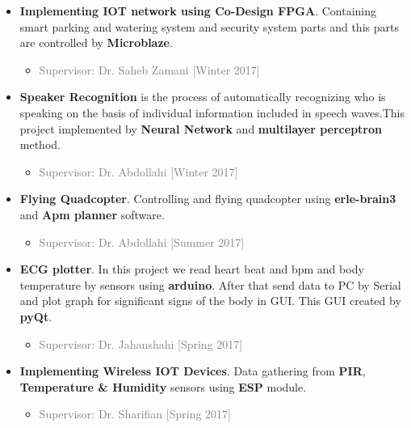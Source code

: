 \documentclass[10pt,a4paper,sans]{moderncv} %
\begin{document}
\begin{itemize}
	\item \textbf{Implementing IOT network using Co-Design FPGA}. Containing smart parking and watering system and security system parts and this parts are controlled by \textbf{Microblaze}.
	\begin{itemize}
		\item \textcolor{gray}{Supervisor: Dr. Saheb Zamani [Winter 2017]}
		\newline
	\end{itemize}

	\item \textbf{Speaker Recognition} is the process of automatically recognizing who is speaking on the basis of individual information included in speech waves.This project implemented by  \textbf{Neural Network} and \textbf{multilayer perceptron} method.
	\begin{itemize}
		\item \textcolor{gray}{Supervisor: Dr. Abdollahi [Winter 2017]}
		\newline
	\end{itemize}

	\item \textbf{Flying Quadcopter}. Controlling and flying quadcopter using \textbf{erle-brain3} and \textbf{Apm planner} software.
	\begin{itemize}
		\item \textcolor{gray}{Supervisor: Dr. Abdollahi [Summer 2017]}
		\newline
	\end{itemize}

	\item \textbf{ECG plotter}. In this project we read heart beat and bpm and body temperature by sensors using \textbf{arduino}. After that send data to PC by Serial and plot graph for significant signs of the body in GUI. This GUI created by \textbf{pyQt}.
	\begin{itemize}
		\item \textcolor{gray}{Supervisor: Dr. Jahanshahi [Spring 2017]}
		\newline
	\end{itemize}

	\item \textbf{Implementing Wireless IOT Devices}. Data gathering from \textbf{PIR}, \textbf{Temperature \& Humidity} sensors using \textbf{ESP} module.
	\begin{itemize}
		\item \textcolor{gray}{Supervisor: Dr. Sharifian [Spring 2017]}
		\newline
	\end{itemize}


\end{itemize}
\end{document}
